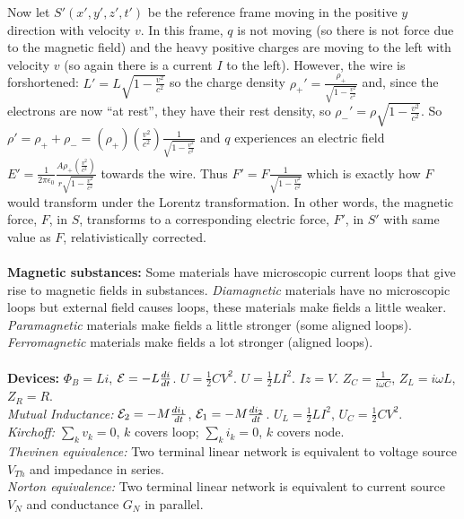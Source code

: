 Now let $S'(x', y', z',t')$ be the reference frame moving in the positive $y$ direction with velocity $v$.  In
this frame, $q$ is not moving (so there is not force due to the magnetic field) and the heavy positive
charges are moving to the left with velocity $v$ (so again there is a current $I$ to the left).  However,
the wire is forshortened: $L'= L
{\sqrt {1- {\frac {v^2}{c^2}}}}$ so the charge density
$\rho_+ ' = {\frac {\rho_+ } {\sqrt {1- {\frac {v^2}{c^2}}}}}$ and, since the electrons are now ``at rest'', they
have their rest density, so
$\rho_- ' = \rho {\sqrt {1- {\frac {v^2}{c^2}}}}$.  So
$\rho'= \rho_+ + \rho_- = (\rho_+) ({\frac {v^2}{c^2}}) {\frac 1 
{\sqrt {1- {\frac {v^2}{c^2}}}}}$ and $q$ experiences an electric field 
$E'= {\frac 1 {2 \pi \epsilon_0}} {\frac {A \rho_+ ({\frac {v^2}{c^2}})}
{r {\sqrt {1- {\frac {v^2}{c^2}}}}}}$ towards the wire.  Thus $F'= F {\frac {1}
{\sqrt {1- {\frac {v^2}{c^2}}}} }$ which is exactly how $F$ would transform under the Lorentz transformation.
In other words, the magnetic force, $F$, in $S$, transforms to a corresponding electric force, $F'$, in $S'$ 
with same value as $F$, relativistically corrected.
\\
\\
{\bf Magnetic substances:}  Some materials have microscopic current loops that give rise to magnetic
fields in substances. 
\emph{Diamagnetic} materials have no microscopic loops but external field causes loops, these materials make
fields a little weaker.
\emph{Paramagnetic} 
materials make fields a little stronger (some aligned loops).
\emph{Ferromagnetic} 
materials make fields a lot stronger (aligned loops).
\\
\\
{\bf Devices:}
$\Phi_B= Li$,
${\cal E} = -L {\frac {d i} {dt}}$.  
$U= {\frac 1 2} C V^2$.
$U= {\frac 1 2} L I^2$.
$Iz=V$. $Z_C= {\frac  1 {i \omega C}}$, $Z_L= i \omega L$, $Z_R= R$. \\
\emph{Mutual Inductance:}
${\cal E}_2 = -M {\frac {d i_1} {dt}}$,  
${\cal E}_1 = -M {\frac {d i_2} {dt}}$.  
$U_L= {\frac 1 2} L I^2$,
$U_C= {\frac 1 2} C V^2$.
\\
\emph{Kirchoff:}
$\sum_{k} v_k=0$, $k$ covers loop; 
$\sum_{k} i_k=0$, $k$ covers node. \\
\emph{Thevinen equivalence:}
Two terminal linear network is equivalent to voltage source $V_{Th}$ and
impedance in series.  \\
\emph{Norton equivalence:} Two terminal linear network is equivalent to current 
source $V_{N}$ and conductance $G_N$ in parallel. \\
